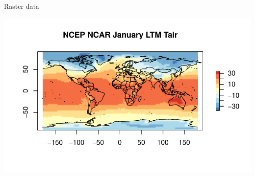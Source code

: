 \documentclass[aspectratio=169]{beamer}\usepackage[]{graphicx}\usepackage[]{color}
\makeatletter
\def\maxwidth{ %
  \ifdim\Gin@nat@width>\linewidth
    \linewidth
  \else
    \Gin@nat@width
  \fi
}
\newenvironment{knitrout}{}{} %
\makeatother
\begin{document}
\begin{frame}[fragile]{Raster data}

\begin{knitrout}\scriptsize
{}\color{fgcolor}
\includegraphics[width=\maxwidth]{figure/unnamed-chunk-6-1} 

\end{knitrout}
\end{frame}
\end{document}
